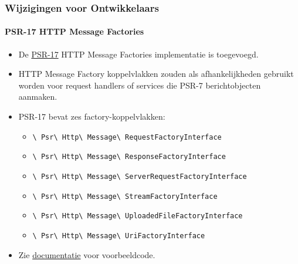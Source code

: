 
\begin{frame}[fragile]
	\frametitle{Wijzigingen voor Ontwikkelaars}
	\framesubtitle{PSR-17 HTTP Message Factories}

	\begin{itemize}
		\item De \href{https://www.php-fig.org/psr/psr-17/}{PSR-17}
			HTTP Message Factories implementatie is toegevoegd.
		\item HTTP Message Factory koppelvlakken zouden als afhankelijkheden gebruikt worden voor
			request handlers of services die PSR-7 berichtobjecten aanmaken.
		\item PSR-17 bevat zes factory-koppelvlakken:

			\begin{itemize}\smaller
				\item \texttt{\textbackslash
					Psr\textbackslash
					Http\textbackslash
					Message\textbackslash
					RequestFactoryInterface}
				\item \texttt{\textbackslash
					Psr\textbackslash
					Http\textbackslash
					Message\textbackslash
					ResponseFactoryInterface}
				\item \texttt{\textbackslash
					Psr\textbackslash
					Http\textbackslash
					Message\textbackslash
					ServerRequestFactoryInterface}
				\item \texttt{\textbackslash
					Psr\textbackslash
					Http\textbackslash
					Message\textbackslash
					StreamFactoryInterface}
				\item \texttt{\textbackslash
					Psr\textbackslash
					Http\textbackslash
					Message\textbackslash
					UploadedFileFactoryInterface}
				\item \texttt{\textbackslash
					Psr\textbackslash
					Http\textbackslash
					Message\textbackslash
					UriFactoryInterface}

			\end{itemize}\normalsize

		\item Zie
			\href{https://docs.typo3.org/c/typo3/cms-core/master/en-us/Changelog/10.1/Feature-89018-ProvideImplementationForPSR-17HTTPMessageFactories.html}{documentatie}
			voor voorbeeldcode.

	\end{itemize}

\end{frame}

